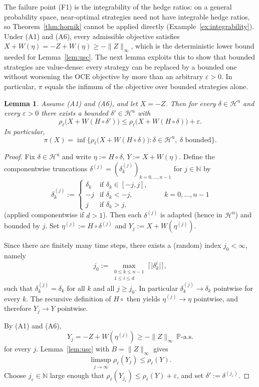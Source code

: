 \documentclass[11pt,a4paper]{report}
\numberwithin{equation}{chapter}
\theoremstyle{plain}
\newtheorem{lemma}[proposition]{Lemma}
\theoremstyle{definition}
\newcommand{\PP}{\mathbb{P}}
\newcommand{\N}{\mathbb{N}}
\newcommand{\Hu}{\mathcal{H}^{\mathrm{u}}}
\newcommand{\as}{\ \PP\text{-a.s.}}
\begin{document}
The failure point (F1) is the integrability of the hedge ratios: on a
general probability space, near-optimal strategies need not have
integrable hedge ratios, so Theorem~\ref{thm:hornik} cannot be applied
directly (Example~\ref{ex:integrability}). Under (A1) and (A6), every
admissible objective satisfies
$X+W(\eta)=-Z+W(\eta)\ge-\|Z\|_\infty$, which is the deterministic
lower bound needed for Lemma~\ref{lem:usc}. The next lemma exploits
this to show that bounded strategies are value-dense: every strategy
can be replaced by a bounded one without worsening the OCE objective by
more than an arbitrary $\varepsilon>0$. In particular, $\pi$ equals the
infimum of the objective over bounded strategies alone.

\begin{lemma}\label{lem:truncation}
  Assume (A1) and (A6), and let $X=-Z$. Then for every $\delta\in\Hu$ and
  every $\varepsilon>0$ there exists a bounded $\delta'\in\Hu$ with
  \[
    \rho_\ell\bigl(X+W(H\circ\delta')\bigr)
    \le\rho_\ell\bigl(X+W(H\circ\delta)\bigr)+\varepsilon.
  \]
  In particular,
  \[
    \pi(X)=\inf\bigl\{\rho_\ell\bigl(X+W(H\circ\delta)\bigr):
    \delta\in\Hu,\ \delta\text{ bounded}\bigr\}.
  \]
\end{lemma}

\begin{proof}
  Fix $\delta\in\Hu$ and write $\eta:=H\circ\delta$, $Y:=X+W(\eta)$.
  Define the componentwise truncations
  $\delta^{(j)}=(\delta^{(j)}_k)_{k=0,\dots,n-1}$ for $j\in\N$ by
  \[
    \delta^{(j)}_k:=
    \begin{cases}
      \delta_k & \text{if }\delta_k\in[-j,j], \\
      -j       & \text{if }\delta_k<-j,       \\
      j        & \text{if }\delta_k>j,
    \end{cases}
    \qquad k=0,\dots,n-1
  \]
  (applied componentwise if $d>1$). Then each $\delta^{(j)}$ is adapted
  (hence in $\Hu$) and bounded by $j$. Set
  $\eta^{(j)}:=H\circ\delta^{(j)}$ and $Y_j:=X+W(\eta^{(j)})$.

  Since there are finitely many time steps, there exists a (random)
  index $j_0<\infty$, namely
  \[
    j_0
    :=
    \max_{\substack{0\le k\le n-1\\ 1\le i\le d}}
    \bigl\lceil\bigl|\delta_k^i\bigr|\bigr\rceil,
  \]
  such that $\delta^{(j)}_k=\delta_k$ for all $k$ and all $j\ge j_0$. In
  particular $\delta^{(j)}_k\to\delta_k$ pointwise for every $k$. The
  recursive definition of $H\circ{}$ then yields $\eta^{(j)}\to\eta$
  pointwise, and therefore $Y_j\to Y$ pointwise.

  By (A1) and (A6),
  \[
    Y_j=-Z+W(\eta^{(j)})\ge-\|Z\|_\infty\as
  \]
  for every $j$. Lemma~\ref{lem:usc} with $B=\|Z\|_\infty$ gives
  \[
    \limsup_{j\to\infty}\rho_\ell(Y_j)\le\rho_\ell(Y).
  \]
  Choose $j_\varepsilon\in\N$ large enough that
  $\rho_\ell(Y_{j_\varepsilon})\le\rho_\ell(Y)+\varepsilon$, and set
  $\delta':=\delta^{(j_\varepsilon)}$.
\end{proof}
\end{document}
